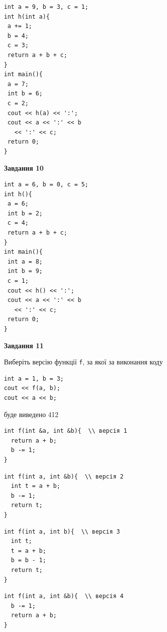 \documentclass[12pt, ukrainian]{article}
\def\code#1{\Verb!#1!}
\begin{document}
{\begin {large}
\begin{minipage}[t]{7.0cm}
\begin{verbatim}
int a = 9, b = 3, c = 1;
int h(int a){
 a += 1;
 b = 4;
 c = 3;
 return a + b + c;
}
int main(){
 a = 7;
 int b = 6;
 c = 2;
 cout << h(a) << ':';
 cout << a << ':' << b 
   << ':' << c;
 return 0;
}
\end{verbatim}



\begin{center}
\textbf{Завдання 10}
\end{center}
\vspace{-8mm}

\begin{verbatim}
int a = 6, b = 0, c = 5;
int h(){
 a = 6;
 int b = 2;
 c = 4;
 return a + b + c;
}
int main(){
 int a = 8;
 int b = 9;
 c = 1;
 cout << h() << ':';
 cout << a << ':' << b 
   << ':' << c;
 return 0;
}
\end{verbatim}

\end{minipage}
\vline \hspace{1mm}
\begin{minipage}[t]{11.0cm}

\begin{center}
\textbf{Завдання 11}
\end{center}
Виберіть версію функції \code{f}, за якої за виконання коду
\begin{verbatim}
int a = 1, b = 3;
cout << f(a, b);
cout << a << b;
\end{verbatim}

буде виведено 412

\begin{verbatim}
int f(int &a, int &b){  \\ версія 1
  return a + b;
  b -= 1;
}
\end{verbatim}

\vspace{-8mm}\begin{verbatim}
int f(int a, int &b){  \\ версія 2
  int t = a + b;
  b -= 1;
  return t;
}
\end{verbatim}

\vspace{-8mm}\begin{verbatim}
int f(int a, int b){  \\ версія 3
  int t;
  t = a + b;
  b = b - 1;
  return t;
}
\end{verbatim}

\vspace{-8mm}\begin{verbatim}
int f(int a, int &b){  \\ версія 4
  b -= 1;
  return a + b;
}
\end{verbatim}




\end{minipage}
\end{large}}
\end{document}
